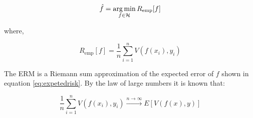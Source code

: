 \begin{equation*}
\hat{f} = \operatorname*{arg\,min}_{f \in \mathcal{H}} R_{\text{emp}}[f] 
\end{equation*}

\noindent where, 

\begin{equation} 
\label{eq:erm}
R_{\text{emp}}[f] = \frac{1}{n} \sum_{i=1}^n V(f(x_i),y_i)   
\end{equation}

The ERM is a Riemann sum approximation of the expected error of $f$ shown in
equation \ref{eq:expetedrisk}. By the law of large numbers it is known that:

\begin{equation}
\frac{1}{n} \sum_{i=1}^n V(f(x_i),y_i) \xrightarrow{n \rightarrow \infty}  E[V(f(x),y)]
\end{equation}


